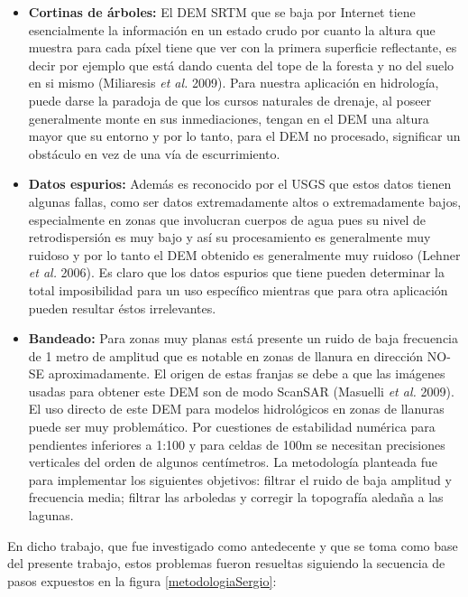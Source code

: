 \documentclass[10pt,a4paper, twoside]{report}
\begin{document}
\begin{itemize}
	\item \textbf{Cortinas de árboles:} El DEM SRTM que se baja por Internet tiene esencialmente la información en un estado crudo por cuanto la altura que muestra para cada píxel tiene que ver con la primera superficie reflectante, es decir por ejemplo que está dando cuenta del tope de la foresta y no del suelo en si mismo (Miliaresis \textit{et al.} 2009). Para nuestra aplicación en hidrología, puede darse la paradoja de que los cursos naturales de drenaje, al poseer generalmente monte en sus inmediaciones, tengan en el DEM una altura mayor que su entorno y por lo tanto, para el DEM no procesado, significar un obstáculo en vez de una vía de escurrimiento.
	\item \textbf{Datos espurios:} Además es reconocido por el USGS que estos datos tienen algunas fallas, como ser datos extremadamente altos o extremadamente bajos, especialmente en zonas que involucran cuerpos de agua pues su nivel de retrodispersión es muy bajo y así su procesamiento es generalmente muy ruidoso y por lo tanto el DEM obtenido es generalmente muy ruidoso (Lehner \textit{et al.} 2006). Es claro que los datos espurios que tiene pueden determinar la total imposibilidad para un uso específico mientras que para otra aplicación pueden resultar éstos irrelevantes.
	\item \textbf{Bandeado:} Para zonas muy planas está presente un ruido de baja frecuencia de 1 metro de amplitud que es notable en zonas de llanura en dirección NO-SE aproximadamente. El origen de estas franjas se debe a que las imágenes usadas para obtener este DEM son de modo ScanSAR (Masuelli \textit{et al.} 2009). El uso directo de este DEM para modelos hidrológicos en zonas de llanuras puede ser muy problemático. Por cuestiones de estabilidad numérica para pendientes inferiores a 1:100 y para celdas de 100m se necesitan precisiones verticales del orden de algunos centímetros. La metodología planteada fue para implementar los siguientes objetivos: filtrar el ruido de baja amplitud y frecuencia media; filtrar las arboledas y corregir la topografía aledaña a las lagunas.	
\end{itemize}


En dicho trabajo, que fue investigado como antedecente y que se toma como base del presente trabajo, estos problemas fueron resueltas siguiendo la secuencia de pasos expuestos en la figura \ref{metodologiaSergio}:
\end{document}
